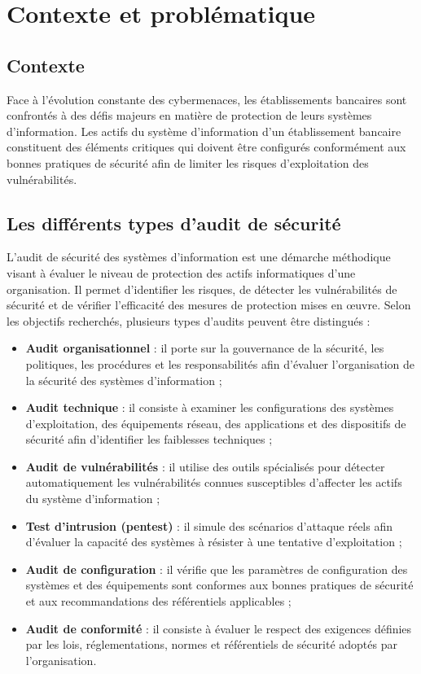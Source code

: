 \chapter{Contexte et problématique}
\label{chap:contexte}

\section{Contexte}

Face à l'évolution constante des cybermenaces, les établissements bancaires sont confrontés à des défis majeurs en matière de protection de leurs systèmes d'information. Les actifs du système d'information d'un établissement bancaire constituent des éléments critiques qui doivent être configurés conformément aux bonnes pratiques de sécurité afin de limiter les risques d'exploitation des vulnérabilités.

\section{Les différents types d'audit de sécurité}

L'audit de sécurité des systèmes d'information est une démarche méthodique visant à évaluer le niveau de protection des actifs informatiques d'une organisation. Il permet d'identifier les risques, de détecter les vulnérabilités de sécurité et de vérifier l'efficacité des mesures de protection mises en œuvre. Selon les objectifs recherchés, plusieurs types d'audits peuvent être distingués :

\begin{itemize}
  \item \textbf{Audit organisationnel} : il porte sur la gouvernance de la sécurité, les politiques, les procédures et les responsabilités afin d'évaluer l'organisation de la sécurité des systèmes d'information ;
  \item \textbf{Audit technique} : il consiste à examiner les configurations des systèmes d'exploitation, des équipements réseau, des applications et des dispositifs de sécurité afin d'identifier les faiblesses techniques ;
  \item \textbf{Audit de vulnérabilités} : il utilise des outils spécialisés pour détecter automatiquement les vulnérabilités connues susceptibles d'affecter les actifs du système d'information ;
  \item \textbf{Test d'intrusion (pentest)} : il simule des scénarios d'attaque réels afin d'évaluer la capacité des systèmes à résister à une tentative d'exploitation ;
  \item \textbf{Audit de configuration} : il vérifie que les paramètres de configuration des systèmes et des équipements sont conformes aux bonnes pratiques de sécurité et aux recommandations des référentiels applicables ;
  \item \textbf{Audit de conformité} : il consiste à évaluer le respect des exigences définies par les lois, réglementations, normes et référentiels de sécurité adoptés par l'organisation.
\end{itemize}

